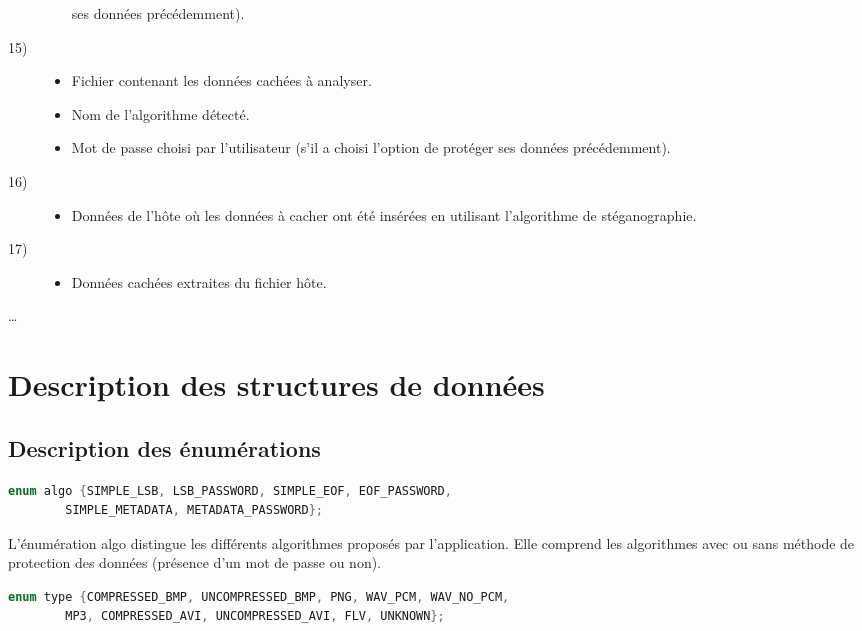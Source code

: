 \documentclass[11pt]{article}
\begin{document}
\begin{multicols}{2}
\begin{description}
\begin{itemize}
    ses données précédemment).
\end{itemize}
\item[15)]
\begin{itemize}
\item Fichier contenant les données cachées à analyser.
\item Nom de l'algorithme détecté.
\item Mot de passe choisi par l'utilisateur (s'il a choisi l'option de protéger
    ses données précédemment).
\end{itemize}
\item[16)]
\begin{itemize}
\item Données de l'hôte où les données à cacher ont été insérées en utilisant
    l'algorithme de stéganographie.
\end{itemize}
\item[17)]
\begin{itemize}
\item Données cachées extraites du fichier hôte.
\end{itemize}
\end{description}
  \ldots
\end{multicols}

\section{Description des structures de données}

\subsection{Description des énumérations}

\begin{lstlisting}[language=c]
enum algo {SIMPLE_LSB, LSB_PASSWORD, SIMPLE_EOF, EOF_PASSWORD, 
        SIMPLE_METADATA, METADATA_PASSWORD};
\end{lstlisting}

L'énumération algo distingue les différents algorithmes proposés par 
l'application. Elle comprend les algorithmes avec ou sans méthode de 
protection des données (présence d'un mot de passe ou non). 
\newline 

\begin{lstlisting}[language=c]
enum type {COMPRESSED_BMP, UNCOMPRESSED_BMP, PNG, WAV_PCM, WAV_NO_PCM, 
        MP3, COMPRESSED_AVI, UNCOMPRESSED_AVI, FLV, UNKNOWN};
\end{lstlisting}
\end{document}
